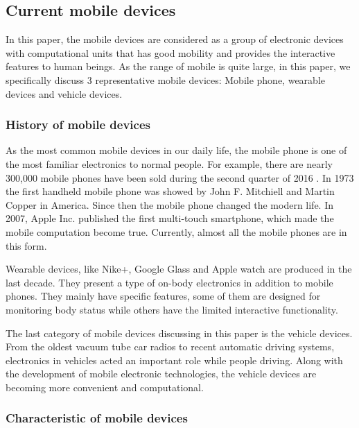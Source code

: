\documentclass[article]{aaltoseries}
\begin{document}


\subsection{Current mobile devices} %

In this paper, the mobile devices are considered as a group of electronic devices with
computational units that has good mobility and provides the interactive features to human beings.
As the range of mobile is quite large, in this paper, we specifically discuss 3 representative 
mobile devices: Mobile phone, wearable devices and vehicle devices.




\subsubsection{History of mobile devices}

As the most common mobile devices in our daily life, the mobile phone is one of the most familiar 
electronics to normal people. For example, there are nearly 300,000 mobile phones have been 
sold during the second quarter of 2016 \cite{moblePhoneSale}. In 1973 the first handheld mobile phone
was showed by John F. Mitchiell and Martin Copper in America. Since then the mobile phone 
changed the modern life. In 2007, Apple Inc. published the first multi-touch smartphone,
 which made the mobile computation become true.
  Currently, almost all the mobile phones are in this form. 


Wearable devices, like Nike+, Google Glass and Apple watch are produced in the last decade. They present
a type of on-body electronics in addition to mobile phones. They mainly have specific features, some of them
are designed for monitoring body status while others have the limited interactive functionality.

The last category of mobile devices discussing in this paper is the vehicle devices. From the oldest vacuum tube
car radios to recent automatic driving systems, electronics in vehicles acted an important role while people
driving. Along with the development of mobile electronic technologies, the vehicle devices are becoming more convenient
and computational.



\subsubsection{Characteristic of mobile devices}
\label{sec:characteristic_mobile_devices}
\end{document}
